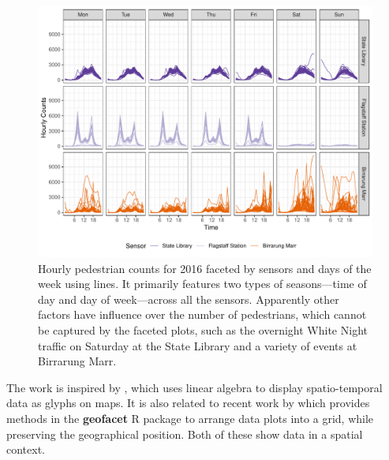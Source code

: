 \documentclass[12pt]{article}
\begin{document}
\begin{figure}

{\centering \includegraphics[width=\textwidth]{figure/facet-time-1} 

}

\caption{Hourly pedestrian counts for 2016 faceted by sensors and days of the week using lines. It primarily features two types of seasons---time of day and day of week---across all the sensors. Apparently other factors have influence over the number of pedestrians, which cannot be captured by the faceted plots, such as the overnight White Night traffic on Saturday at the State Library and a variety of events at Birrarung Marr.}\label{fig:facet-time}
\end{figure}



The work is inspired by \citet{Wickham2012glyph}, which uses linear algebra to display spatio-temporal data as glyphs on maps. It is also related to recent work by \citet{R-geofacet} which provides methods in the \textbf{geofacet} R package to arrange data plots into a grid, while preserving the geographical position. Both of these show data in a spatial context.
\end{document}
